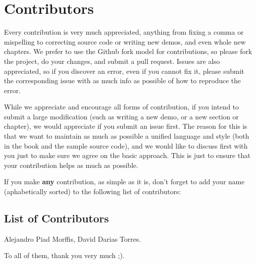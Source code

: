 \chapter*{Contributors}

Every contribution is very much appreciated, anything from fixing a comma or mispelling to correcting
source code or writing new demos, and even whole new chapters. We prefer to use the Github fork model
for contributions, so please fork the project, do your changes, and submit a pull request. Issues
are also appreciated, so if you discover an error, even if you cannot fix it, please submit the
corresponding issue with as much info as possible of how to reproduce the error.

While we appreciate and encourage all forms of contribution, if you intend to submit a large
modification (such as writing a new demo, or a new section or chapter), we would appreciate
if you submit an issue first. The reason for this is that we want to maintain as much as possible
a unified language and style (both in the book and the sample source code), and we would like
to discuss first with you just to make sure we agree on the basic approach. This is just to ensure
that your contribution helps as much as possible.

If you make \textbf{any} contribution, as simple as it is, don't forget to add your name (aphabetically sorted)
to the following list of contributors:

\section*{List of Contributors}

Alejandro Piad Morffis,
David Darias Torres.

\vspace{1cm}
To all of them, thank you very much ;).
